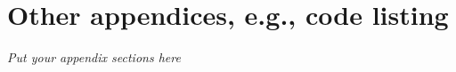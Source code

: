 \documentclass{report}
\begin{document}



\appendix

\printbibliography[heading=bibintoc]

\chapter{Other appendices, e.g., code listing}  %
\emph{Put your appendix sections here}

\end{document}
